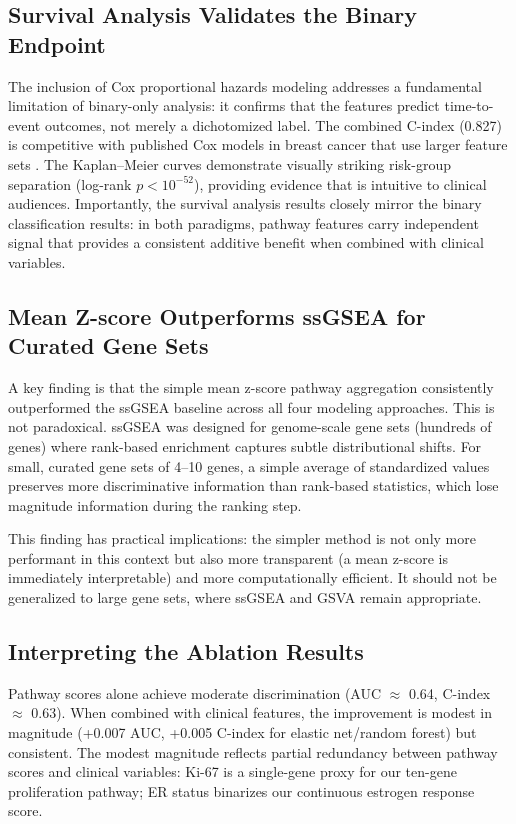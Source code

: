 \documentclass[11pt]{article}
\begin{document}
\subsection{Survival Analysis Validates the Binary Endpoint}

The inclusion of Cox proportional hazards modeling addresses a fundamental limitation of binary-only analysis: it confirms that the features predict time-to-event outcomes, not merely a dichotomized label. The combined C-index (0.827) is competitive with published Cox models in breast cancer that use larger feature sets \citep{chen2021pathway}. The Kaplan--Meier curves demonstrate visually striking risk-group separation (log-rank $p < 10^{-52}$), providing evidence that is intuitive to clinical audiences. Importantly, the survival analysis results closely mirror the binary classification results: in both paradigms, pathway features carry independent signal that provides a consistent additive benefit when combined with clinical variables.

\subsection{Mean Z-score Outperforms ssGSEA for Curated Gene Sets}

A key finding is that the simple mean z-score pathway aggregation consistently outperformed the ssGSEA baseline across all four modeling approaches. This is not paradoxical. ssGSEA was designed for genome-scale gene sets (hundreds of genes) where rank-based enrichment captures subtle distributional shifts. For small, curated gene sets of 4--10 genes, a simple average of standardized values preserves more discriminative information than rank-based statistics, which lose magnitude information during the ranking step.

This finding has practical implications: the simpler method is not only more performant in this context but also more transparent (a mean z-score is immediately interpretable) and more computationally efficient. It should not be generalized to large gene sets, where ssGSEA and GSVA remain appropriate.

\subsection{Interpreting the Ablation Results}

Pathway scores alone achieve moderate discrimination (AUC $\approx$ 0.64, C-index $\approx$ 0.63). When combined with clinical features, the improvement is modest in magnitude (+0.007 AUC, +0.005 C-index for elastic net/random forest) but consistent. The modest magnitude reflects partial redundancy between pathway scores and clinical variables: Ki-67 is a single-gene proxy for our ten-gene proliferation pathway; ER status binarizes our continuous estrogen response score.
\end{document}
